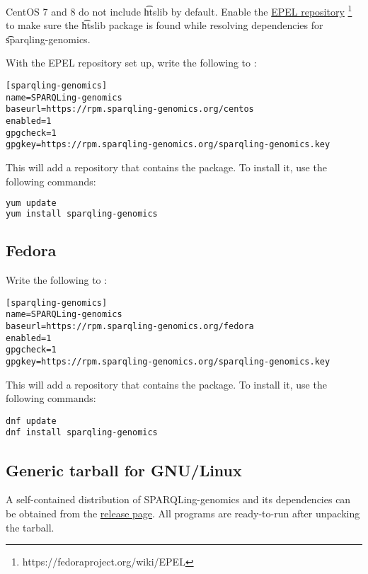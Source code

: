   CentOS 7 and 8 do not include \t{htslib} by default.  Enable the
  \href{https://fedoraproject.org/wiki/EPEL}{EPEL repository}%
  \footnote{https://fedoraproject.org/wiki/EPEL} to make sure the
  \t{htslib} package is found while resolving dependencies for
  \t{sparqling-genomics}.

  With the EPEL repository set up, write the following to
  :

\begin{lstlisting}
[sparqling-genomics]
name=SPARQLing-genomics
baseurl=https://rpm.sparqling-genomics.org/centos
enabled=1
gpgcheck=1
gpgkey=https://rpm.sparqling-genomics.org/sparqling-genomics.key
\end{lstlisting}

This will add a repository that contains the  package.
To install it, use the following commands:

\begin{lstlisting}[language=bash]
yum update
yum install sparqling-genomics
\end{lstlisting}

\subsection{Fedora}

Write the following to :

\begin{lstlisting}
[sparqling-genomics]
name=SPARQLing-genomics
baseurl=https://rpm.sparqling-genomics.org/fedora
enabled=1
gpgcheck=1
gpgkey=https://rpm.sparqling-genomics.org/sparqling-genomics.key
\end{lstlisting}

This will add a repository that contains the  package.
To install it, use the following commands:

\begin{lstlisting}
dnf update
dnf install sparqling-genomics
\end{lstlisting}

\subsection{Generic tarball for GNU/Linux}

  A self-contained distribution of SPARQLing-genomics and its dependencies
  can be obtained from the \href{https://github.com/UMCUGenetics/sparqling-genomics/releases}%
  {release page}.  All programs are ready-to-run after unpacking the tarball.

